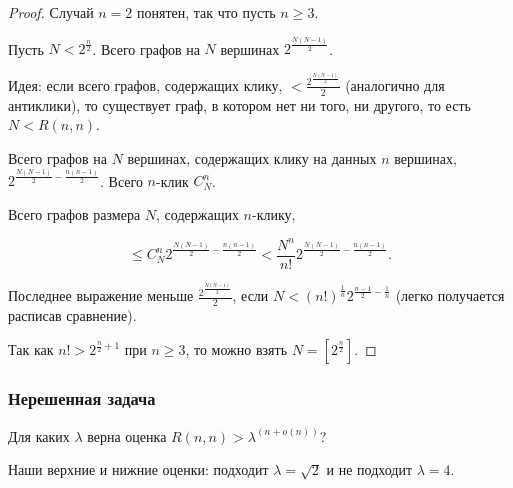 \begin{proof}
    Случай $n = 2$ понятен, так что пусть $n \geq 3$.

    Пусть $N < 2^{\frac{n}{2}}$. Всего графов на $N$ вершинах $2^{\frac{N(N-1)}{2}}$.

    Идея: если всего графов, содержащих клику, $< \frac{2^{\frac{N(N-1)}{2}}}{2}$ (аналогично для антиклики), то существует граф, в котором нет ни того, ни другого, то есть $N < R(n, n)$.

    Всего графов на $N$ вершинах, содержащих клику на данных $n$ вершинах, $2^{\frac{N(N-1)}{2} - \frac{n(n-1)}{2}}$. Всего $n$-клик $C_N^n$.

    Всего графов размера $N$, содержащих $n$-клику,

    \[ \leq C_N^n 2^{\frac{N(N-1)}{2} - \frac{n(n-1)}{2}} < \frac{N^n}{n!}2^{\frac{N(N-1)}{2} - \frac{n(n-1)}{2}}. \]

    Последнее выражение меньше $\frac{2^{\frac{N(N-1)}{2}}}{2}$, если $N < (n!)^{\frac{1}{n}} 2^{\frac{n - 1}{2} - \frac{1}{n}}$ (легко получается расписав сравнение).

    Так как $n! > 2^{\frac{n}{2} + 1}$ при $n \geq 3$, то можно взять $N = \left[ 2^{\frac{n}{2}} \right]$.
\end{proof}

\subsubsection*{Нерешенная задача}

Для каких $\lambda$ верна оценка $R(n, n) > \lambda^{(n + o(n))}$?

Наши верхние и нижние оценки: подходит $\lambda = \sqrt{2}$ и не подходит $\lambda = 4$.